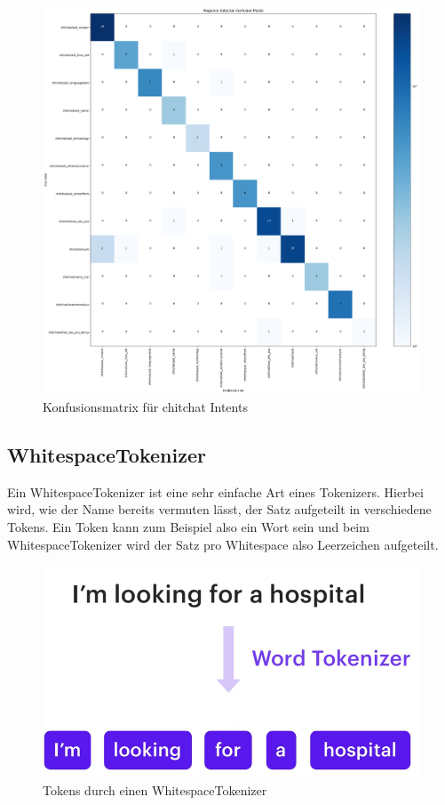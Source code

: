 \begin{figure}[hbt!]
    \centering
    \includegraphics[scale=0.3]{pics/confusion_matrix}
    \caption{Konfusionsmatrix für chitchat Intents}
    \label{fig:confusion_matrix}
\end{figure}

\subsection{WhitespaceTokenizer}

Ein WhitespaceTokenizer ist eine sehr einfache Art eines Tokenizers.
Hierbei wird, wie der Name bereits vermuten lässt, der Satz aufgeteilt in verschiedene Tokens.
Ein Token kann zum Beispiel also ein Wort sein und beim WhitespaceTokenizer wird der Satz pro Whitespace also Leerzeichen aufgeteilt.\cite{whitespaceTokenizer, rasaMasterclassWhitespaceTokenizer, pipelineComponentsYoutube}

\begin{figure}[hbt!]
    \centering
    \includegraphics[scale=0.25]{pics/whitespacetokenizer}
    \caption{Tokens durch einen WhitespaceTokenizer~\cite{pipelineComponentsYoutube}}
    \label{fig:WhitespaceTokenizer}
\end{figure}

